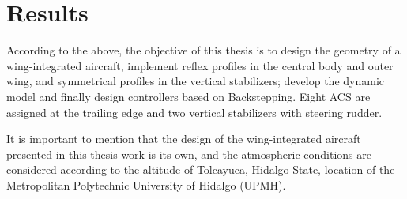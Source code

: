 


\section{Results}

According to the above, the objective of this thesis is to design the geometry of a wing-integrated aircraft, implement reflex profiles in the central body and outer wing, and symmetrical profiles in the vertical stabilizers; develop the dynamic model and finally design controllers based on Backstepping. Eight ACS are assigned at the trailing edge and two vertical stabilizers with steering rudder.

It is important to mention that the design of the wing-integrated aircraft presented in this thesis work is its own, and the atmospheric conditions are considered according to the altitude of Tolcayuca, Hidalgo State, location of the Metropolitan Polytechnic University of Hidalgo (UPMH).

